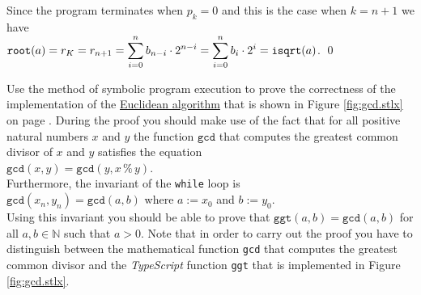 Since the program terminates when $p_k = 0$ and this is the case when  $k=n+1$ we have
\\[0.2cm]
\hspace*{1.3cm}
$\displaystyle \mathtt{root}(a) = r_K = r_{n+1} = \sum\limits_{i=0}^{n} b_{n-i} \cdot 2^{n-i} = \sum\limits_{i=0}^{n} b_i \cdot 2^i = \mathtt{isqrt}(a)$. \qed

\exerciseEng
Use the method of symbolic program execution to prove the correctness of the implementation of the
\href{https://en.wikipedia.org/wiki/Euclidean_algorithm}{Euclidean algorithm} that is shown in Figure
\ref{fig:gcd.stlx} on page \pageref{fig:gcd.stlx}.  During the proof 
you should make use of the fact that for all positive natural numbers $x$ and $y$ the function $\mathtt{gcd}$
that computes the greatest common divisor of $x$ and $y$ satisfies the equation
\\[0.2cm]
\hspace*{1.3cm}
$\mathtt{gcd}(x, y) = \mathtt{gcd}(y, x \,\mathtt{\%}\, y)$.
\\[0.2cm]
Furthermore, the invariant of the \texttt{while} loop is
\\[0.2cm]
\hspace*{1.3cm}
$\mathtt{gcd}(x_n, y_n) = \mathtt{gcd}(a, b)$ \quad where $a := x_0$ and $b := y_0$.
\\[0.2cm]
Using this invariant you should be able to prove that $\mathtt{ggt}(a, b) = \mathtt{gcd}(a, b)$ for all
$a, b \in \mathbb{N}$ such that $a > 0$.  Note that in order to carry out the proof you have to distinguish
between the mathematical function \texttt{gcd} that computes the greatest common divisor and the \textsl{TypeScript}
function \texttt{ggt} that is implemented in Figure \ref{fig:gcd.stlx}.
\eox

